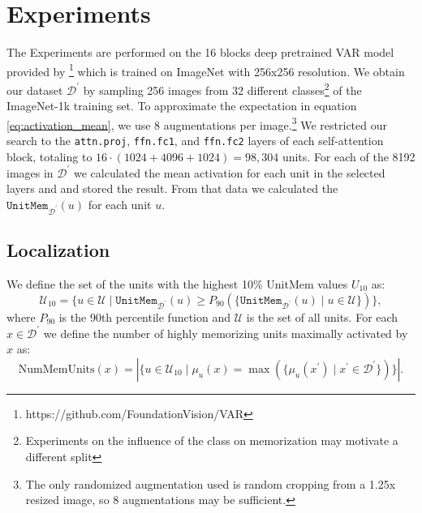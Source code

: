 \documentclass{article} %
\begin{document}
\section{Experiments}
The Experiments are performed on the 16 blocks deep pretrained VAR model provided by \citet{tianVisualAutoregressiveModeling2024}\footnote{https://github.com/FoundationVision/VAR} which is trained on ImageNet with 256x256 resolution.
We obtain our dataset $\mathcal{D}^\prime$ by sampling 256 images from 32 different classes\footnote{Experiments on the influence of the class on memorization may motivate a different split} of the ImageNet-1k training set.
To approximate the expectation in equation \ref{eq:activation_mean}, we use 8 augmentations per image.\footnote{The only randomized augmentation used is random cropping from a 1.25x resized image, so 8 augmentations may be sufficient.}
We restricted our search to the \texttt{attn.proj}, \texttt{ffn.fc1}, and \texttt{ffn.fc2} layers of each self-attention block, totaling to $16\cdot (1024 + 4096 + 1024) = 98,304$ units.
For each of the 8192 images in $\mathcal{D}^\prime$ we calculated the mean activation for each unit in the selected layers and and stored the result.
From that data we calculated the $\texttt{UnitMem}_{\mathcal{D}^\prime}(u)$ for each unit $u$.
\subsection{Localization}
We define the set of the units with the highest 10\% UnitMem values $U_{10}$ as:
\begin{equation}\label{eq:mem_units}
   \mathcal{U}_{10} = \{u \in \mathcal{U} \mid\texttt{UnitMem}_{\mathcal{D}^\prime}(u) \geq P_{90}(\{\texttt{UnitMem}_{\mathcal{D}^\prime}(u) \mid u \in \mathcal{U}\})\},
\end{equation}
where $P_{90}$ is the 90th percentile function and $\mathcal{U}$ is the set of all units.
For each $x \in \mathcal{D}^\prime$ we define the number of highly memorizing units maximally activated by $x$ as:
\[\text{NumMemUnits}(x) = |\{u \in \mathcal{U}_{10} \mid \mu_u(x) = \max(\{\mu_u(x^\prime) \mid x^\prime \in \mathcal{D}^\prime\})\}|.\]
\end{document}
